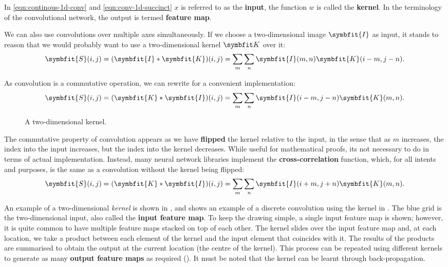 In \cref{eqn:continous-1d-conv} and \cref{eqn:conv-1d-succinct} $x$ is referred to as the \textbf{input}, the function $w$ is called the \textbf{kernel}. In the terminology of the convolutional network, the output is termed \textbf{feature map}.

We can also use convolutions over multiple axes simultaneously. If we choose a two-dimensional image $\symbfit{I}$ as input, it stands to reason that we would probably want to use a two-dimensional kernel $\symbfit K$ over it:
\begin{equation}
\label{eqn:convolution-2d}
\symbfit{S}(i, j)=(\symbfit{I} * \symbfit{K})(i, j)=\sum_{m} \sum_{n} \symbfit{I}(m, n) \symbfit{K}(i-m, j-n).
\end{equation}

As convolution is a commutative operation, we can rewrite  for a convenient implementation:
\begin{equation}
\symbfit{S}(i, j)=(\symbfit{K} * \symbfit{I})(i, j)=\sum_{m} \sum_{n} \symbfit{I}(i-m, j-n) \symbfit{K}(m, n).
\end{equation}

\begin{figure}
    \centering
    
    \caption{A two-dimensional kernel.}
    \label{fig:2d-kernel-sample}
\end{figure}

The commutative property of convolution appears as we have \textbf{flipped} the kernel relative to the input, in the sense that as $m$ increases, the index into the input increases, but the index into the kernel decreases. While useful for mathematical proofs, its not necessary to do in terms of actual implementation. Instead, many neural network libraries implement the \textbf{cross-correlation} function, which, for all intents and purposes, is the same as a convolution without the kernel being flipped:
\begin{equation}
\symbfit{S}(i, j)=(\symbfit{K} * \symbfit{I})(i, j)=\sum_{m} \sum_{n} \symbfit{I}(i+m, j+n) \symbfit{K}(m, n).
\end{equation}\label{eqn:conv-2d-cross-correl}

An example of a two-dimensional \textit{kernel} is shown in , and  shows an example of a discrete convolution using the kernel in . 
The blue grid is the two-dimensional input, also called the \textbf{input feature map}. To keep the drawing simple, a single input feature map is shown; however, it is quite common to have multiple feature maps stacked on top of each other.
The kernel slides over the input feature map and, at each location, we take a product between each element of the kernel and the input element that coincides with it.
The results of the products are summarised to obtain the output at the current location (the centre of the kernel).
This process can be repeated using different kernels to generate as many \textbf{output feature maps} as required (). It must be noted that the kernel can be learnt through back-propagation.

